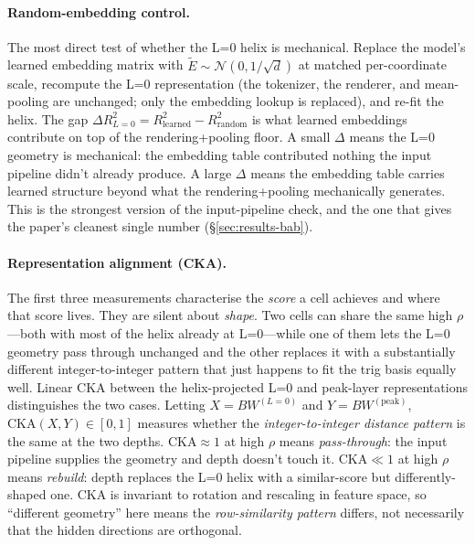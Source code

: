 \documentclass[10pt,letterpaper]{article}
\begin{document}
\paragraph{Random-embedding control.} The most direct test of whether
the L=0 helix is mechanical. Replace the model's learned embedding
matrix with $\tilde{E} \sim \mathcal{N}(0, 1/\sqrt{d})$ at matched
per-coordinate scale, recompute the L=0 representation (the tokenizer,
the renderer, and mean-pooling are unchanged; only the embedding
lookup is replaced), and re-fit the helix. The gap
$\Delta R^2_{L=0} = R^2_{\mathrm{learned}} - R^2_{\mathrm{random}}$
is what learned embeddings contribute on top of the rendering+pooling
floor. A small $\Delta$ means the L=0 geometry is mechanical: the
embedding table contributed nothing the input pipeline didn't already
produce. A large $\Delta$ means the embedding table carries learned
structure beyond what the rendering+pooling mechanically generates.
This is the strongest version of the input-pipeline check, and the
one that gives the paper's cleanest single number
(\S\ref{sec:results-bab}).

\paragraph{Representation alignment (CKA).} The first three
measurements characterise the \emph{score} a cell achieves and where
that score lives. They are silent about \emph{shape}. Two cells can
share the same high $\rho$---both with most of the helix already at
L=0---while one of them lets the L=0 geometry pass through unchanged
and the other replaces it with a substantially different
integer-to-integer pattern that just happens to fit the trig basis
equally well. Linear CKA \citep{kornblith2019similarity} between the
helix-projected L=0 and peak-layer representations distinguishes the
two cases. Letting $X = B W^{(L=0)}$ and $Y = B W^{(\text{peak})}$,
$\mathrm{CKA}(X,Y) \in [0,1]$ measures whether the
\emph{integer-to-integer distance pattern} is the same at the two
depths. $\mathrm{CKA} \approx 1$ at high $\rho$ means
\emph{pass-through}: the input pipeline supplies the geometry and
depth doesn't touch it. $\mathrm{CKA} \ll 1$ at high $\rho$ means
\emph{rebuild}: depth replaces the L=0 helix with a similar-score
but differently-shaped one. CKA is invariant to rotation and
rescaling in feature space, so ``different geometry'' here means the
\emph{row-similarity pattern} differs, not necessarily that the
hidden directions are orthogonal.
\end{document}
